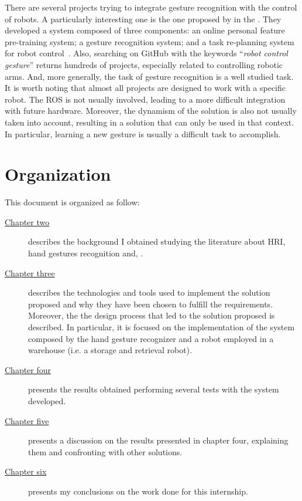 \documentclass[../thesis.tex]{subfiles}
\begin{document}
There are several projects trying to integrate gesture recognition with the control of robots. A particularly interesting one is the one proposed by \citeauthor{paper:chen2019online} in the \citeyear{paper:chen2019online}.  They developed a system composed of three components: an online personal feature pre-training system; a gesture recognition system; and a task re-planning system for robot control~\cite{paper:chen2019online}. Also, searching on GitHub with the keywords ``\textit{robot control gesture}'' returns hundreds of projects, especially related to controlling robotic arms. And, more generally, the task of gesture recognition is a well studied task.\\

It is worth noting that almost all projects are designed to work with a specific robot. The \gls{ROS} is not usually involved, leading to a more difficult integration with future hardware. Moreover, the dynamism of the solution is also not usually taken into account, resulting in a solution that can only be used in that context. In particular, learning a new gesture is usually a difficult task to accomplish.

\section{Organization}\label{s:organization}
This document is organized as follow:
\begin{description}
    \item[{\hyperref[cap:theory]{Chapter two}}] describes the background I obtained studying the literature about \acrlong{HRI}, hand gestures recognition and, .
    \item[{\hyperref[cap:methods]{Chapter three}}] describes the technologies and tools used to implement the solution proposed and why they have been chosen to fulfill the requirements. Moreover, the the design process that led to the solution proposed is described. In particular, it is focused on the implementation of the system composed by the hand gesture recognizer and a robot employed in a warehouse (i.e. a storage and retrieval robot).
    \item[{\hyperref[cap:results]{Chapter four}}] presents the results obtained performing several tests with the system developed.
    \item[{\hyperref[cap:discussion]{Chapter five}}] presents a discussion on the results presented in chapter four, explaining them and confronting with other solutions.
    \item[{\hyperref[cap:conclusion]{Chapter six}}] presents my conclusions on the work done for this internship. 
\end{description}
\end{document}
